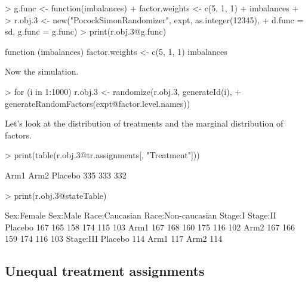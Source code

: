 \documentclass[11pt, letter]{article}
\numberwithin{equation}{section}
\begin{document}
\begin{Schunk}
\begin{Sinput}
> g.func <- function(imbalances) {
+     factor.weights <- c(5, 1, 1)
+     imbalances %*% factor.weights
+ }
> r.obj.3 <- new("PocockSimonRandomizer", expt, as.integer(12345), 
+     d.func = sd, g.func = g.func)
> print(r.obj.3@g.func)
\end{Sinput}
\begin{Soutput}
function (imbalances) 
{
    factor.weights <- c(5, 1, 1)
    imbalances %*% factor.weights
}
\end{Soutput}
\end{Schunk}

Now the simulation.

\begin{Schunk}
\begin{Sinput}
> for (i in 1:1000) r.obj.3 <- randomize(r.obj.3, generateId(i), 
+     generateRandomFactors(expt@factor.level.names))
\end{Sinput}
\end{Schunk}

Let's look at the distribution of treatments and the marginal
distribution of factors.

\begin{Schunk}
\begin{Sinput}
> print(table(r.obj.3@tr.assignments[, "Treatment"]))
\end{Sinput}
\begin{Soutput}
   Arm1    Arm2 Placebo 
    335     333     332 
\end{Soutput}
\begin{Sinput}
> print(r.obj.3@stateTable)
\end{Sinput}
\begin{Soutput}
        Sex:Female Sex:Male Race:Caucasian Race:Non-caucasian Stage:I Stage:II
Placebo        167      165            158                174     115      103
Arm1           167      168            160                175     116      102
Arm2           167      166            159                174     116      103
        Stage:III
Placebo       114
Arm1          117
Arm2          114
\end{Soutput}
\end{Schunk}

\subsection{Unequal treatment assignments}
\label{sec:unequal-randomization}
\end{document}
